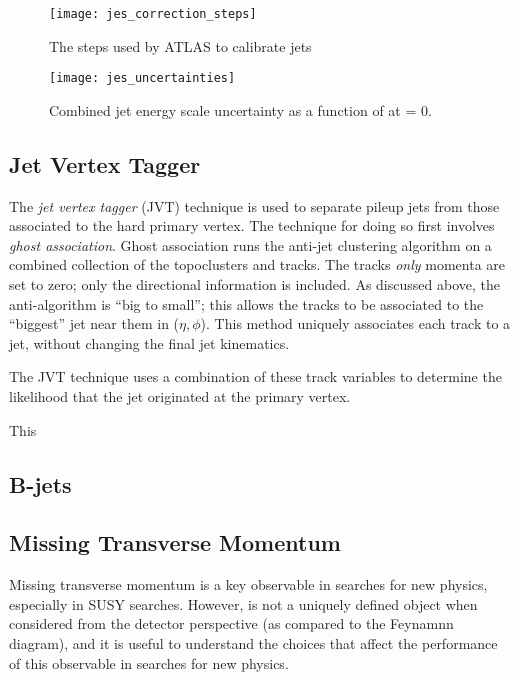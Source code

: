 \begin{figure}
\caption{The steps used by ATLAS to calibrate jets} \label{fig:jes_correction_steps}
\texttt{[image: jes\_correction\_steps]}
\end{figure}


\begin{figure}
\caption{Combined jet energy scale uncertainty as a function of \pt at \eta = 0.} \label{fig:jes_uncertainties}
\texttt{[image: jes\_uncertainties]}
\end{figure}

\subsection{Jet Vertex Tagger}

The \textit{jet vertex tagger} (JVT)  technique is used to separate pileup jets from those associated to the hard primary vertex.
The technique for doing so first involves \textit{ghost association}.
Ghost association runs the anti-\kt jet clustering algorithm on a combined collection of the topoclusters and tracks.
The tracks \textit{only} momenta are set to zero\footnotemark; only the directional information is included.
As discussed above, the anti-\kt algorithm is ``big to small''; this allows the tracks to be associated to the ``biggest'' jet near them in ($\eta, \phi$).
This method uniquely associates each track to a jet, without changing the final jet kinematics.

The JVT technique uses a combination of these track variables to determine the likelihood that the jet originated at the primary vertex.

This

\subsection{B-jets}

\subsection{Missing Transverse Momentum}

Missing transverse momentum \met is a key observable in searches for new physics, especially in SUSY searches.
However, \met is not a uniquely defined object when considered from the detector perspective (as compared to the Feynamnn diagram), and it is useful to understand the choices that affect the performance of this observable in searches for new physics.

